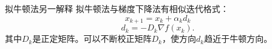 \documentclass[handout,10pt]{beamer} %
\begin{document}












\begin{frame}{拟牛顿法另一解释}
拟牛顿法与梯度下降法有相似迭代格式：
\begin{equation}\label{EQ_1_3_1}
    x_{k+1}=x_k+\alpha_kd_k
\end{equation}
\begin{equation}\label{EQ_1_3_1}
    d_k=-D_k\nabla f(x_k).
\end{equation}   
其中$D_k$是正定矩阵。可以不断校正矩阵$D_k$，使方向$d_k$趋近于牛顿方向。
\end{frame}
\end{document}
